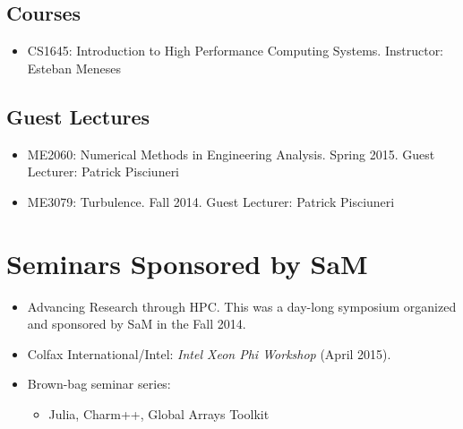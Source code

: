 \subsection*{Courses}
\begin{itemize}
    \item CS1645: Introduction to High Performance Computing Systems.  Instructor: Esteban Meneses
\end{itemize}

\subsection*{Guest Lectures}
\begin{itemize}
    \item ME2060: Numerical Methods in Engineering Analysis.  Spring 2015.
          Guest Lecturer: Patrick Pisciuneri
    \item ME3079: Turbulence.  Fall 2014.
          Guest Lecturer: Patrick Pisciuneri

\end{itemize}

\section{Seminars Sponsored by SaM }
\begin{itemize}
    \item Advancing Research through HPC.  This was a day-long symposium
          organized and sponsored by SaM in the Fall 2014.
    \item Colfax International/Intel: \textit{Intel Xeon Phi Workshop} (April 2015).
    \item Brown-bag seminar series:
    \begin{itemize}
        \item Julia, Charm++, Global Arrays Toolkit
    \end{itemize}
\end{itemize}
